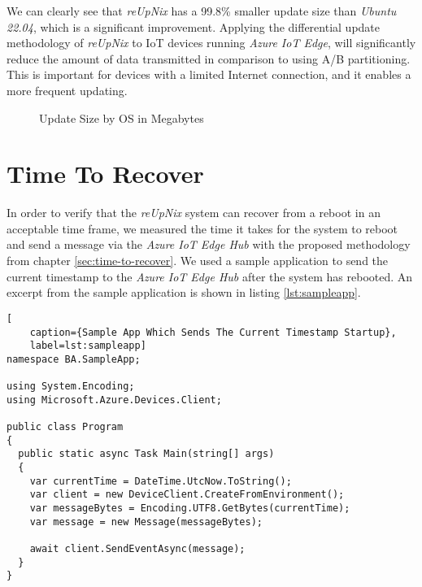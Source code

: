 \noindent
We can clearly see that \textit{reUpNix} has a 99.8\% smaller update size
than \textit{Ubuntu 22.04}, which is a significant improvement. Applying the
differential update methodology of \textit{reUpNix} to \ac{IoT} devices
running \textit{Azure IoT Edge}, will significantly reduce the amount of data
transmitted in comparison to using A/B partitioning. This is important for
devices with a limited Internet connection, and it enables a more frequent updating.

\begin{figure}[htbp]
  \centering
\caption{Update Size by OS in Megabytes}
\end{figure}

\clearpage

\section{Time To Recover}
In order to verify that the \textit{reUpNix} system can recover from a reboot
in an acceptable time frame, we measured the time it takes for the system to
reboot and send a message via the \textit{Azure IoT Edge Hub} with the proposed
methodology from chapter \ref{sec:time-to-recover}. We used a sample application
to send the current timestamp to the \textit{Azure IoT Edge Hub} after the system
has rebooted. An excerpt from the sample application is shown in listing
\ref{lst:sampleapp}.


\begin{lstlisting}[
    caption={Sample App Which Sends The Current Timestamp Startup},
    label=lst:sampleapp]
namespace BA.SampleApp;

using System.Encoding;
using Microsoft.Azure.Devices.Client;

public class Program
{
  public static async Task Main(string[] args)
  {
    var currentTime = DateTime.UtcNow.ToString();
    var client = new DeviceClient.CreateFromEnvironment();
    var messageBytes = Encoding.UTF8.GetBytes(currentTime);
    var message = new Message(messageBytes);

    await client.SendEventAsync(message);
  }
}
\end{lstlisting}

